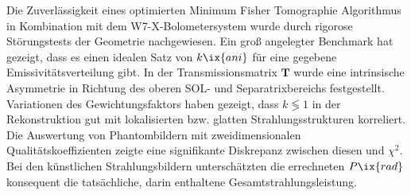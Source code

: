         Die Zuverlässigkeit eines optimierten Minimum Fisher Tomographie Algorithmus in Kombination mit dem W7-X-Bolometersystem wurde durch rigorose Störungstests der Geometrie nachgewiesen. Ein groß angelegter Benchmark hat gezeigt, dass es einen idealen Satz von $k\ix{ani}$ für eine gegebene Emissivitätsverteilung gibt. In der Transmissionsmatrix $\mathbf{T}$ wurde eine intrinsische Asymmetrie in Richtung des oberen SOL- und Separatrixbereichs festgestellt. Variationen des Gewichtungsfaktors haben gezeigt, dass $k\lessgtr1$ in der Rekonstruktion gut mit lokalisierten bzw. glatten Strahlungsstrukturen korreliert. Die Auswertung von Phantombildern mit zweidimensionalen Qualitätskoeffizienten zeigte eine signifikante Diskrepanz zwischen diesen und $\chi^{2}$. Bei den künstlichen Strahlungsbildern unterschätzten die errechneten $P\ix{rad}$ konsequent die tatsächliche, darin enthaltene Gesamtstrahlungsleistung.%
%